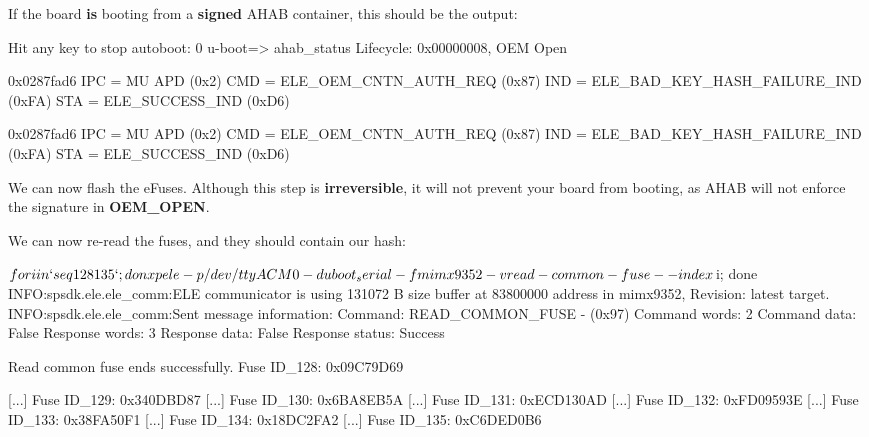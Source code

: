 If the board \textbf{is} booting from a \textbf{signed} AHAB container, this should be the output:

\begin{bashinput}
Hit any key to stop autoboot:  0 
u-boot=> ahab_status
Lifecycle: 0x00000008, OEM Open


        0x0287fad6
        IPC = MU APD (0x2)
        CMD = ELE_OEM_CNTN_AUTH_REQ (0x87)
        IND = ELE_BAD_KEY_HASH_FAILURE_IND (0xFA)
        STA = ELE_SUCCESS_IND (0xD6)

        0x0287fad6
        IPC = MU APD (0x2)
        CMD = ELE_OEM_CNTN_AUTH_REQ (0x87)
        IND = ELE_BAD_KEY_HASH_FAILURE_IND (0xFA)
        STA = ELE_SUCCESS_IND (0xD6)

\end{bashinput}

We can now flash the eFuses. Although this step is \textbf{irreversible}, it will not prevent your board
from booting, as AHAB will not enforce the signature in \textbf{OEM\_OPEN}.


We can now re-read the fuses, and they should contain our hash:

\begin{bashinput}
$ for i in `seq 128 135`; do nxpele -p /dev/ttyACM0 -d uboot_serial -f mimx9352 -v read-common-fuse --index $i; done
INFO:spsdk.ele.ele_comm:ELE communicator is using 131072 B size buffer at 83800000 address in mimx9352, Revision: latest target.
INFO:spsdk.ele.ele_comm:Sent message information:
Command:         READ_COMMON_FUSE - (0x97)
Command words:   2
Command data:    False
Response words:  3
Response data:   False
Response status: Success

Read common fuse ends successfully.
Fuse ID_128: 0x09C79D69

[...]
Fuse ID_129: 0x340DBD87
[...]
Fuse ID_130: 0x6BA8EB5A
[...]
Fuse ID_131: 0xECD130AD
[...]
Fuse ID_132: 0xFD09593E
[...]
Fuse ID_133: 0x38FA50F1
[...]
Fuse ID_134: 0x18DC2FA2
[...]
Fuse ID_135: 0xC6DED0B6
\end{bashinput}

